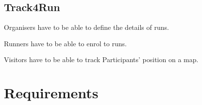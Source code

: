     \subsection{Track4Run}
    \begin{enumerate}[label={[}G3.\arabic*{]}, leftmargin=*]
        \item \label{goal3 : run organization} Organisers have to be able to define the details of runs.
        \item \label{goal3 : enrolling} Runners have to be able to enrol to runs.
        \item \label{goal3 : tracking} Visitors have to be able to track Participants' position on a map.
    \end{enumerate}


\section{Requirements}
    

